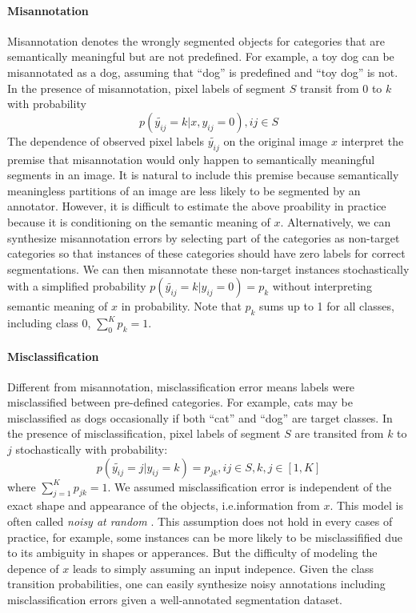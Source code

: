\paragraph{Misannotation}
\noindent
Misannotation denotes the wrongly segmented objects for categories that are semantically meaningful but are not predefined.
For example, a toy dog can be misannotated as a dog, assuming that ``dog'' is predefined and ``toy dog'' is not.
In the presence of misannotation, pixel labels of segment $S$ transit from $0$ to $k$ with probability
$$p(\tilde{y_{ij}}=k \vert x, y_{ij}=0), ij \in S $$
The dependence of observed pixel labels $\tilde{y_{ij}}$ on the original image $x$ interpret the premise that misannotation would only happen to semantically meaningful segments in an image.
It is natural to include this premise because semantically meaningless partitions of an image are less likely to be segmented by an annotator.
However, it is difficult to estimate the above proability in practice because it is conditioning on the semantic meaning of $x$.
Alternatively, we can synthesize misannotation errors by selecting part of the categories as non-target categories so that instances of these categories should have zero labels for correct segmentations.
We can then misannotate these non-target instances stochastically with a simplified probability $p(\tilde{y_{ij}}=k \vert y_{ij}=0)=p_k$ without  interpreting semantic meaning of $x$ in probability.
Note that $p_k$ sums up to 1 for all classes, including class 0, $\sum_0^K p_k = 1$.

\noindent
\paragraph{Misclassification}
Different from misannotation, misclassification error means labels were misclassified between pre-defined categories.
For example, cats may be misclassified as dogs occasionally if both ``cat'' and ``dog'' are target classes.
In the presence of misclassification, pixel labels of segment $S$ are transited from $k$ to $j$ stochastically with probability:
$$p(\tilde{y_{ij}}=j \vert y_{ij}=k) = p_{jk}, ij \in S, k,j \in [1,K]$$
where $\sum_{j=1}^{K}p_{jk}=1$.
We assumed misclassification error is independent of the exact shape and appearance of the objects, i.e.information from $x$.
This model is often called \textit{noisy at random} \cite{frenay2014classification}.
This assumption does not hold in every cases of practice, for example, some instances can be more likely to be misclassifified due to its ambiguity in shapes or apperances.
But the difficulty of modeling the depence of $x$ leads to simply assuming an input indepence.
Given the class transition probabilities, one can easily synthesize noisy annotations including misclassification errors given a well-annotated segmentation dataset.

